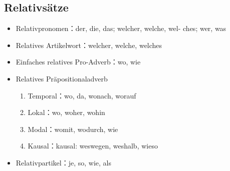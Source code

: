 \documentclass[UTF8]{report}
\begin{document}
\subsection{Relativsätze}
\begin{itemize}
    \item Relativpronomen：der, die, das; welcher, welche, wel- ches; wer, was
    \item Relatives Artikelwort：welcher, welche, welches
    \item Einfaches relatives Pro-Adverb：wo, wie
    \item Relatives Präpositionaladverb
    \begin{enumerate}
        \item Temporal：wo, da, wonach, worauf
        \item Lokal：wo, woher, wohin
        \item Modal：womit, wodurch, wie
        \item Kausal：kausal: weswegen, weshalb, wieso
    \end{enumerate}
    \item Relativpartikel：je, so, wie, als
\end{itemize}
\end{document}
